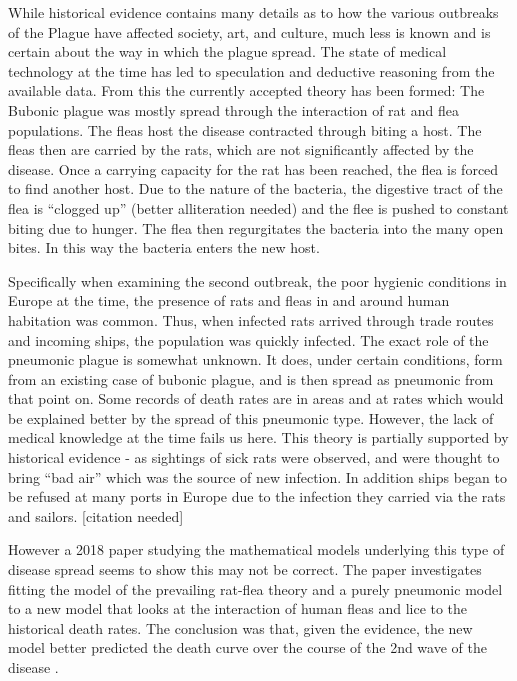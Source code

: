 \documentclass [letterpaper, 12pt] {article}
\begin{document}
While historical evidence contains many details as to how the various outbreaks of the Plague have affected society, art, and culture, much less is known and is certain about the way in which the plague spread. The state of medical technology at the time has led to speculation and deductive reasoning from the available data. From this the currently accepted theory has been formed: The Bubonic plague was mostly spread through the interaction of rat and flea populations. The fleas host the disease contracted through biting a host. The fleas then are carried by the rats, which are not significantly affected by the disease. Once a carrying capacity for the rat has been reached, the flea is forced to find another host. Due to the nature of the bacteria, the digestive tract of the flea is “clogged up” (better alliteration needed) and the flee is pushed to constant biting due to hunger. The flea then regurgitates the bacteria into the many open bites. In this way the bacteria enters the new host. 

Specifically when examining the second outbreak, the poor hygienic conditions in Europe at the time, the presence of rats and fleas in and around human habitation was common. Thus, when infected rats arrived through trade routes and incoming ships, the population was quickly infected.
The exact role of the pneumonic plague is somewhat unknown. It does, under certain conditions, form from an existing case of bubonic plague, and is then spread as pneumonic from that point on. Some records of death rates are in areas and at rates which would be explained better by the spread of this pneumonic type. However, the lack of medical knowledge at the time fails us here.
This theory is partially supported by historical evidence - as sightings of sick rats were observed, and were thought to bring “bad air” which was the source of new infection. In addition ships began to be refused at many ports in Europe due to the infection they carried via the rats and sailors. [citation needed]

However a 2018 paper studying the mathematical models underlying this type of disease spread seems to show this may not be correct. The paper investigates fitting the model of the prevailing rat-flea theory and a purely pneumonic model to a new model that looks at the interaction of human fleas and lice to the historical death rates. The conclusion was that, given the evidence, the new model better predicted the death curve over the course of the 2nd wave of the disease \cite{Dean1304} .
\end{document}
